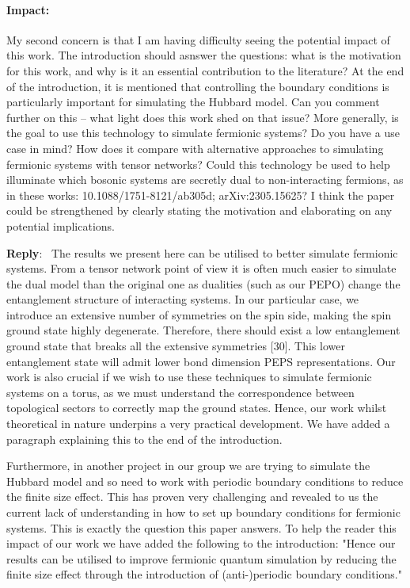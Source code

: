 \documentclass[aps,prx,floatfix,10pt,amssymb,amsfont,amsmath,superscriptaddress,float,nofootinbib,longbibliography,nobalancelastpage]{revtex4-2}
\newenvironment{reply}
   {\medskip \noindent \begin{sf}\textbf{Reply}:\ \color{blue}  }
   {\medskip \end{sf}}
\begin{document}
\paragraph*{Impact:} My second concern is that I am having difficulty seeing the potential impact of this work. The introduction should asnswer the questions: what is the motivation for this work, and why is it an essential contribution to the literature? At the end of the introduction, it is mentioned that controlling the boundary conditions is particularly important for simulating the Hubbard model. Can you comment further on this – what light does this work shed on that issue? More generally, is the goal to use this technology to simulate fermionic systems? Do you have a use case in mind? How does it compare with alternative approaches to simulating fermionic systems with tensor networks? Could this technology be used to help illuminate which bosonic systems are secretly dual to non-interacting fermions, as in these works: 10.1088/1751-8121/ab305d; arXiv:2305.15625? I think
the paper could be strengthened by clearly stating the motivation and elaborating on any potential
implications.

\begin{reply}
    The results we present here can be utilised to better simulate fermionic systems. From a tensor network point of view it is often much easier to simulate the dual model than the original one as dualities (such as our PEPO) change the entanglement structure of interacting systems. In our particular case, we introduce an extensive number of symmetries on the spin side, making the spin ground state highly degenerate. Therefore, there should exist a low entanglement ground state that breaks all the extensive symmetries [30]. This lower entanglement state will admit lower bond dimension PEPS representations. Our work is also crucial if we wish to use these techniques to simulate fermionic systems on a torus, as we must understand the correspondence between topological sectors to correctly map the ground states. Hence, our work whilst theoretical in nature underpins a very practical development. We have added a paragraph explaining this to the end of the introduction. 
    
    Furthermore, in another project in our group we are trying to simulate the Hubbard model and so need to work with periodic boundary conditions to reduce the finite size effect. This has proven very challenging and revealed to us the current lack of understanding in how to set up boundary conditions for fermionic systems. This is exactly the question this paper answers. To help the reader this impact of our work we have added the following to the introduction:
    "Hence our results can be utilised to improve fermionic quantum simulation by reducing the finite size effect through the introduction of (anti-)periodic boundary conditions."
\end{reply}
\end{document}
